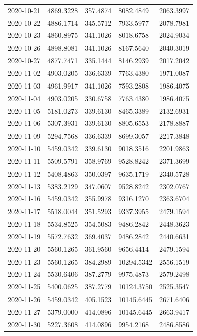 \begin{footnotesize}
\begin{longtable}{lllll}
2020-10-21 & 4869.3228 & 357.4874 & 8082.4849 & 2063.3997 \\
2020-10-22 & 4886.1714 & 345.5712 & 7933.5977 & 2078.7981 \\
2020-10-23 & 4860.8975 & 341.1026 & 8018.6758 & 2024.9034 \\
2020-10-26 & 4898.8081 & 341.1026 & 8167.5640 & 2040.3019 \\
2020-10-27 & 4877.7471 & 335.1444 & 8146.2939 & 2017.2042 \\
2020-11-02 & 4903.0205 & 336.6339 & 7763.4380 & 1971.0087 \\
2020-11-03 & 4961.9917 & 341.1026 & 7593.2808 & 1986.4075 \\
2020-11-04 & 4903.0205 & 330.6758 & 7763.4380 & 1986.4075 \\
2020-11-05 & 5181.0273 & 339.6130 & 8465.3389 & 2132.6931 \\
2020-11-06 & 5307.3931 & 339.6130 & 8805.6553 & 2178.8887 \\
2020-11-09 & 5294.7568 & 336.6339 & 8699.3057 & 2217.3848 \\
2020-11-10 & 5459.0342 & 339.6130 & 9018.3516 & 2201.9863 \\
2020-11-11 & 5509.5791 & 358.9769 & 9528.8242 & 2371.3699 \\
2020-11-12 & 5408.4863 & 350.0397 & 9635.1719 & 2340.5728 \\
2020-11-13 & 5383.2129 & 347.0607 & 9528.8242 & 2302.0767 \\
2020-11-16 & 5459.0342 & 355.9978 & 9316.1270 & 2363.6704 \\
2020-11-17 & 5518.0044 & 351.5293 & 9337.3955 & 2479.1594 \\
2020-11-18 & 5534.8525 & 354.5083 & 9486.2842 & 2448.3623 \\
2020-11-19 & 5572.7632 & 369.4037 & 9486.2842 & 2440.6631 \\
2020-11-20 & 5560.1265 & 361.9560 & 9656.4414 & 2479.1594 \\
2020-11-23 & 5560.1265 & 384.2989 & 10294.5342 & 2556.1519 \\
2020-11-24 & 5530.6406 & 387.2779 & 9975.4873 & 2579.2498 \\
2020-11-25 & 5400.0625 & 387.2779 & 10124.3750 & 2525.3547 \\
2020-11-26 & 5459.0342 & 405.1523 & 10145.6445 & 2671.6406 \\
2020-11-27 & 5379.0000 & 414.0896 & 10145.6445 & 2663.9417 \\
2020-11-30 & 5227.3608 & 414.0896 & 9954.2168 & 2486.8586 \\

\end{longtable}
\end{footnotesize}
